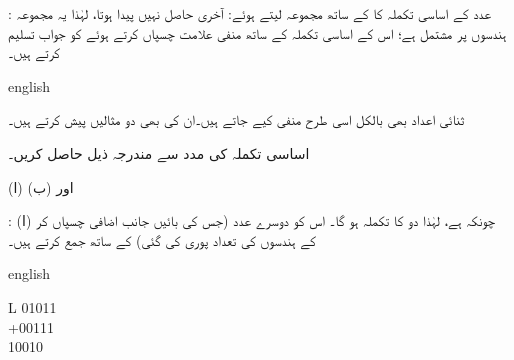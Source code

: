 :\quad 
عدد  کے اساسی تکملہ  کا  کے ساتھ مجموعہ لیتے ہوئے:  آخری حاصل  نہیں پیدا ہوتا، لہٰذا یہ مجموعہ 
  ہندسوں پر مشتمل ہے؛ اس کے اساسی تکملہ  کے ساتھ منفی علامت چسپاں کرتے ہوئے  کو جواب تسلیم کرتے ہیں۔
\begin{center}
\begin{otherlanguage*}{english}
\begin{LTR}
\quad\quad
{}\quad\quad
{}\quad\quad
{}
\end{LTR}
\end{otherlanguage*}
\end{center}

ثنائی اعداد بھی بالکل اسی طرح منفی کیے جاتے ہیں۔ان کی بھی دو مثالیں پیش کرتے ہیں۔
	

 اساسی تکملہ کی مدد سے مندرجہ ذیل حاصل کریں۔
 
(ا)  اور (ب) 

:\quad
(ا) چونکہ  ہے، لہٰذا دو کا تکملہ  ہو گا۔ اس کو دوسرے عدد  (جس کی بائیں جانب اضافی  چسپاں کر کے ہندسوں کی تعداد پوری کی گئی) کے ساتھ جمع کرتے ہیں۔
\begin{center}
\begin{otherlanguage*}{english}
\begin{LTR}
\begin{tabular}{L}
\phantom{+}01011\\
+00111\\
\midrule
\phantom{+}10010
\end{tabular}
\end{LTR}
\end{otherlanguage*}
\end{center}

